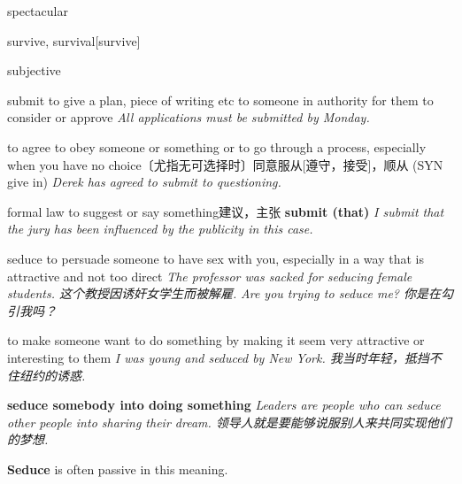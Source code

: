 \begin{DefWord}{spectacular}
\end{DefWord}

\begin{DefWord}{survive, survival}[survive]
\end{DefWord}

\begin{DefWord}{subjective}
\end{DefWord}

\begin{DefWord}{submit}
    to give a plan, piece of writing etc to someone in authority for them to consider or approve
    \textit{All applications must be submitted by Monday.}

    to agree to obey someone or something or to go through a process, especially when you have no choice〔尤指无可选择时〕同意服从[遵守，接受]，顺从 (SYN  give in)
    \textit{Derek has agreed to submit to questioning.}

    formal law to suggest or say something建议，主张
    \textbf{submit (that)}
    \textit{I submit that the jury has been influenced by the publicity in this case.}
\end{DefWord}

\begin{DefWord}{seduce}
    to persuade someone to have sex with you, especially in a way that is attractive and not too direct
    \textit{The professor was sacked for seducing female students. 这个教授因诱奸女学生而被解雇. }
    \textit{Are you trying to seduce me? 你是在勾引我吗？}

    to make someone want to do something by making it seem very attractive or interesting to them
    \textit{I was young and seduced by New York. 我当时年轻，抵挡不住纽约的诱惑. }

    \textbf{seduce somebody into doing something}
    \textit{Leaders are people who can seduce other people into sharing their dream. 领导人就是要能够说服别人来共同实现他们的梦想. }

    \begin{remark}
        \textbf{Seduce} is often passive in this meaning.
    \end{remark}
\end{DefWord}